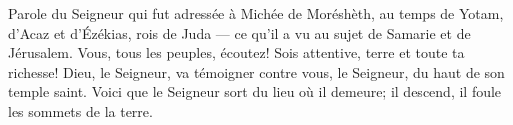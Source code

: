 Parole du Seigneur qui fut adressée à Michée de Moréshèth,
	au temps de Yotam, d’Acaz et d’Ézékias, rois de Juda
	--- ce qu’il a vu au sujet de Samarie et de Jérusalem.
Vous, tous les peuples, écoutez! Sois attentive, terre et toute ta richesse!
	Dieu, le Seigneur, va témoigner contre vous,
	le Seigneur, du haut de son temple saint.
Voici que le Seigneur sort du lieu où il demeure;
	il descend, il foule les sommets de la terre.
